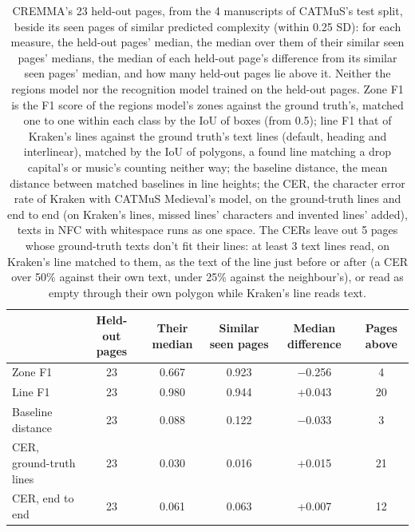 \begin{table}[htbp]
  \centering
  \caption{CREMMA's 23 held-out pages, from the 4 manuscripts of CATMuS's test split, beside its seen pages of similar predicted complexity (within 0.25 SD): for each measure, the held-out pages' median, the median over them of their similar seen pages' medians, the median of each held-out page's difference from its similar seen pages' median, and how many held-out pages lie above it. Neither the regions model nor the recognition model trained on the held-out pages. Zone F1 is the F1 score of the regions model's zones against the ground truth's, matched one to one within each class by the IoU of boxes (from 0.5); line F1 that of Kraken's lines against the ground truth's text lines (default, heading and interlinear), matched by the IoU of polygons, a found line matching a drop capital's or music's counting neither way; the baseline distance, the mean distance between matched baselines in line heights; the CER, the character error rate of Kraken with CATMuS Medieval's model, on the ground-truth lines and end to end (on Kraken's lines, missed lines' characters and invented lines' added), texts in NFC with whitespace runs as one space. The CERs leave out 5 pages whose ground-truth texts don't fit their lines: at least 3 text lines read, on Kraken's line matched to them, as the text of the line just before or after (a CER over 50\% against their own text, under 25\% against the neighbour's), or read as empty through their own polygon while Kraken's line reads text.}
  \label{tab:difficulty_held_out_pages}
  \begin{tabular}{lccccc}
    \toprule
     & Held-out pages & Their median & Similar seen pages & Median difference & Pages above \\
    \midrule
    Zone F1 & 23 & 0.667 & 0.923 & −0.256 & 4 \\
    Line F1 & 23 & 0.980 & 0.944 & +0.043 & 20 \\
    Baseline distance & 23 & 0.088 & 0.122 & −0.033 & 3 \\
    CER, ground-truth lines & 23 & 0.030 & 0.016 & +0.015 & 21 \\
    CER, end to end & 23 & 0.061 & 0.063 & +0.007 & 12 \\
    \bottomrule
  \end{tabular}
\end{table}
